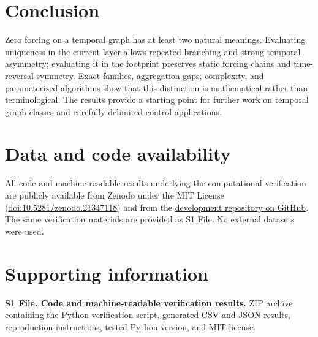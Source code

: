 \documentclass[11pt]{article}
\theoremstyle{definition}
\theoremstyle{remark}
\begin{document}
\section{Conclusion}

Zero forcing on a temporal graph has at least two natural meanings.  Evaluating
uniqueness in the current layer allows repeated branching and strong temporal
asymmetry; evaluating it in the footprint preserves static forcing chains and
time-reversal symmetry.  Exact families, aggregation gaps, complexity, and
parameterized algorithms show that this distinction is mathematical rather
than terminological.  The results provide a starting point for further work on
temporal graph classes and carefully delimited control applications.

\section*{Data and code availability}

All code and machine-readable results underlying the computational verification
are publicly available from Zenodo under the MIT License
(\href{https://doi.org/10.5281/zenodo.21347118}{doi:10.5281/zenodo.21347118})
and from the
\href{https://github.com/krishnatheaverage/temporal-zero-forcing}{development
repository on GitHub}.  The same verification materials are provided as S1
File.  No external datasets were used.




\section*{Supporting information}

\noindent\textbf{S1 File. Code and machine-readable verification results.}
ZIP archive containing the Python verification script, generated CSV and JSON results,
reproduction instructions, tested Python version, and MIT license.
\end{document}
